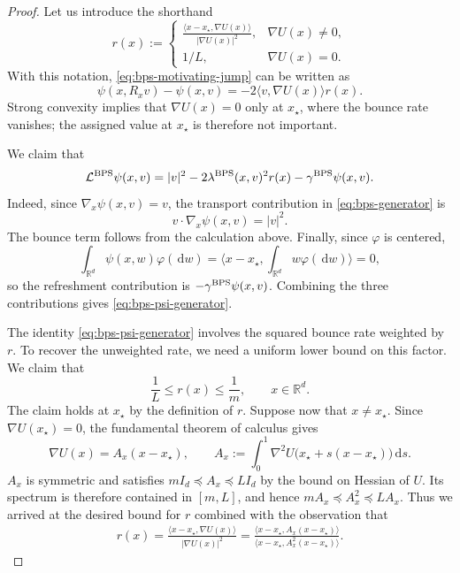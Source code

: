 \documentclass{amsart}
\theoremstyle{plain}
\theoremstyle{definition}
\theoremstyle{remark}
\newcommand{\ud}{\,\mathrm{d}}
\newcommand{\RR}{\mathbb{R}}
\newcommand{\abs}[1]{\lvert#1\rvert}
\newcommand{\R}{\RR}
\newcommand{\1}{\mathbf 1}
\newcommand{\dd}{\ud}
\newcommand{\ip}[2]{\langle #1,#2\rangle}
\newcommand{\bps}{{\rm BPS}}
\begin{document}
\begin{proof}
Let us introduce the shorthand
\[
        r(x):=
        \begin{cases}
        \displaystyle
        \frac{\ip{x-x_\star}{\nabla U(x)}}{\abs{\nabla U(x)}^2},
                &\nabla U(x)\ne0,\\[2mm]
        1/L,    &\nabla U(x)=0.
        \end{cases}
\]
With this notation, \eqref{eq:bps-motivating-jump} can be written as
\[
        \psi(x,R_xv)-\psi(x,v)
        =-2\ip{v}{\nabla U(x)}r(x).
\]
Strong convexity implies that $\nabla U(x)=0$ only at $x_\star$, where the
bounce rate vanishes; the assigned value at $x_\star$ is therefore not important.  

We claim that
\begin{equation}\label{eq:bps-psi-generator}
        \mathcal L^{\bps}\psi(x,v)
        =\abs v^2-2\lambda^{\bps}(x,v)^2r(x)
          -\gamma^{\bps}\psi(x,v).
\end{equation}
Indeed, since $\nabla_x\psi(x,v)=v$, the transport contribution in
\eqref{eq:bps-generator} is
\[
        v\cdot\nabla_x\psi(x,v)=\abs v^2.
\]
The bounce term follows from the calculation above. Finally, since $\varphi$ is centered,
\[
        \int_{\R^d}\psi(x,w)\varphi(\dd w)
        =\ip{x-x_\star}{\int_{\R^d}w\varphi(\dd w)}
        =0,
\]
so the refreshment contribution is
$-\gamma^{\bps}\psi(x,v)$.  Combining the three contributions gives
\eqref{eq:bps-psi-generator}.

The identity \eqref{eq:bps-psi-generator} involves
the squared bounce rate weighted by $r$.  To recover the unweighted rate, we
need a uniform lower bound on this factor.  We claim that
\[
        \frac1L\le r(x)\le\frac1m,
        \qquad x\in\R^d.
\]
The claim holds at $x_\star$ by the definition of $r$.  Suppose now that
$x\ne x_\star$.  Since $\nabla U(x_\star)=0$, the fundamental theorem of
calculus gives
\[
        \nabla U(x)=A_x(x-x_\star),
        \qquad
        A_x:=\int_0^1
        \nabla^2U\bigl(x_\star+s(x-x_\star)\bigr)\dd s.
\]
$A_x$ is symmetric and satisfies
$mI_d\preceq A_x\preceq L I_d$ by the bound on Hessian of $U$.  Its spectrum is therefore contained in
$[m,L]$, and hence $mA_x\preceq A_x^2\preceq LA_x$. Thus we arrived at the desired bound for $r$ combined with the observation that 
\[
\begin{aligned}
        r(x)
        =\frac{\ip{x-x_\star}{\nabla U(x)}}
                {\abs{\nabla U(x)}^2}
        =\frac{\ip{x-x_\star}{A_x(x-x_\star)}}
                {\ip{x-x_\star}{A_x^2(x-x_\star)}}.
\end{aligned}
\]


\end{proof}
\end{document}
